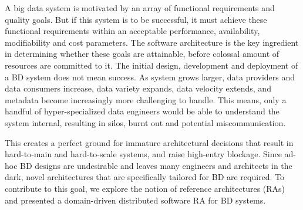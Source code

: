 \documentclass[runningheads]{llncs}
\begin{document}



A big data system is motivated by an array of functional requirements and quality goals. But if this system is to be successful, it must achieve these functional requirements within an acceptable performance, availability, modifiability and cost parameters. The software architecture is the key ingredient in determining whether these goals are attainable, before colossal amount of resources are committed to it. The initial design, development and deployment of a BD system does not mean success. As system grows larger, data providers and data consumers increase, data variety expands, data velocity extends, and metadata become increasingly more challenging to handle. This means, only a handful of hyper-specialized data engineers would be able to understand the system internal, resulting in silos, burnt out and potential miscommunication. 

This creates a perfect ground for immature architectural decisions that result in hard-to-main and hard-to-scale systems, and raise high-entry blockage. Since ad-hoc BD designs are undesirable and leaves many engineers and architects in the dark, novel architectures that are specifically tailored for BD are required. To contribute to this goal, we explore the notion of reference architectures (RAs) and presented a domain-driven distributed software RA for BD systems.
\end{document}
